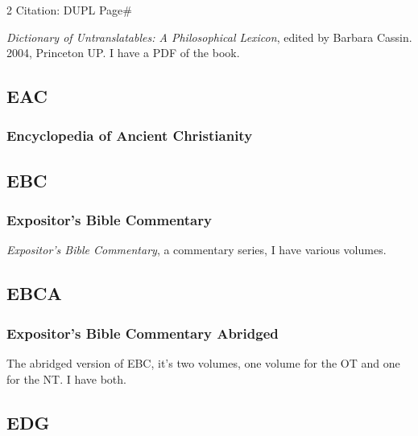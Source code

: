 \begin{multicols}{2}
			Citation:
				DUPL Page\#
		
			\textit{Dictionary of Untranslatables: A Philosophical Lexicon}, edited by Barbara Cassin. 2004, Princeton UP. I have a PDF of the book.
			
	\subsection*{EAC}
	
		\subsubsection*{Encyclopedia of Ancient Christianity}
		
			\phantom{.}
			
	\subsection*{EBC}
	
		\subsubsection*{Expositor's Bible Commentary}
		
			\textit{Expositor's Bible Commentary}, a commentary series, I have various volumes.
			
	\subsection*{EBCA}
	
		\subsubsection*{Expositor's Bible Commentary Abridged}
		
			The abridged version of EBC, it's two volumes, one volume for the OT and one for the NT. I have both.
			
	\subsection*{EDG}
	

\end{multicols}
